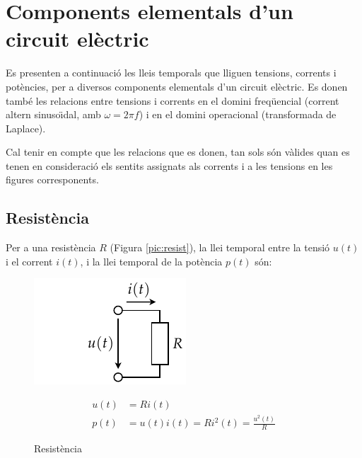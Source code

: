 \section{Components elementals d'un circuit
el\`{e}ctric}\label{sec:comp_elem}

Es presenten a continuaci\'{o} les lleis temporals que lliguen tensions,
corrents i pot\`{e}ncies, per a diversos components elementals d'un
circuit el\`{e}ctric. Es donen tamb\'{e} les relacions entre tensions i
corrents en el domini freq\"{u}encial (corrent altern sinuso\"{\i}dal, amb
$\omega=2\pi f$) i en el domini operacional (transformada de
Laplace).

Cal tenir en compte que les relacions que es donen, tan sols s\'{o}n
v\`{a}lides  quan es tenen en consideraci\'{o} els sentits assignats als
corrents i a les tensions en les figures corresponents.

\subsection{Resist\`{e}ncia} 

Per a una resist\`{e}ncia $R$ (Figura
\vref{pic:resist}), la llei temporal entre la tensi\'{o} $u(t)$ i el
corrent $i(t)$, i la llei temporal de la pot\`{e}ncia $p(t)$ s\'{o}n:
\vspace{-0.5mm}
\begin{figure}[h!]
\hfill
\begin{minipage}[b]{5cm}
    \includegraphics{Imatges/Cap-Fonaments-Resistencia.pdf}
\caption{Resist\`{e}ncia} \label{pic:resist}
\end{minipage}
\hfill
\begin{minipage}[b][3.25cm][t]{8cm}
   \begin{align}
      u(t) &= R i(t) \\  p(t) &= u(t) i(t) = R i^2(t) = \frac{u^2(t)}{R}
   \end{align}
\end{minipage}
\end{figure}

